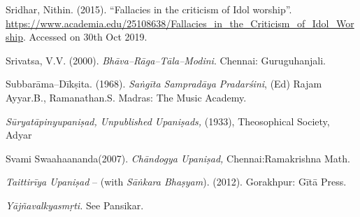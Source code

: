 \begin{thebibliography}{99}
  Sridhar, Nithin. (2015). “Fallacies in the criticism of Idol worship”. \url{https://www.academia.edu/25108638/Fallacies_in_the_Criticism_of_Idol_Worship}. Accessed on 30th Oct 2019.

  Srivatsa, V.V. (2000). \textit{Bhāva–Rāga–Tāla–Modini}. Chennai: Guruguhanjali.

  Subbarāma–Dīkṣita. (1968). \textit{Saṅgīta Sampradāya Pradarśini}, (Ed) Rajam Ayyar.B., Ramanathan.S. Madras: The Music Academy.

  \textit{Sūryatāpinyupaniṣad, Unpublished Upaniṣads,} (1933), Theosophical Society, Adyar

  Svami Swaahaananda(2007).\textit{ Chāndogya Upaniṣad,} Chennai:Ramakrishna Math.

  \textit{Taittirīya Upaniṣad} – (with \textit{Sāṅkara Bhaṣyam}). (2012). Gorakhpur: Gītā Press.

  \textit{Yājñavalkyasmṛti.} See Pansikar.

 \end{thebibliography}

